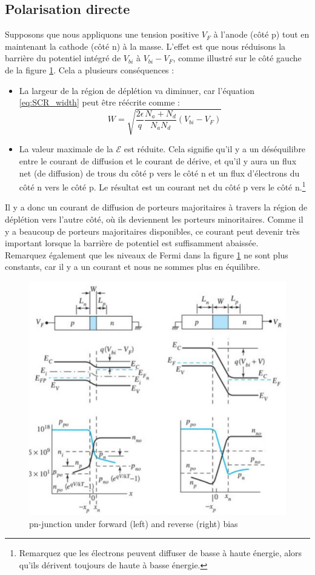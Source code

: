 \subsection{Polarisation directe}
Supposons que nous appliquons une tension positive $V_F$ à l'anode (côté p) tout en maintenant la cathode (côté n) à la masse. L'effet est que nous réduisons la barrière du potentiel intégré de $V_{bi}$ à $V_{bi}-V_F$, comme illustré sur le côté gauche de la figure \ref{fig:pn_bias}. Cela a plusieurs conséquences :
\begin{itemize}
	\item La largeur de la région de déplétion va diminuer, car l'équation \ref{eq:SCR_width} peut être réécrite comme :
	\begin{equation}
		W = \sqrt{\frac{2 \epsilon}{q} \frac{N_a + N_d}{N_a N_d} (V_{bi} - V_F)}
		\label{eq:SCR_width_bias}
	\end{equation}
	\item La valeur maximale de la $\mathcal{E}$  est réduite. Cela signifie qu'il y a un déséquilibre entre le courant de diffusion et le courant de dérive, et qu'il y aura un flux net (de diffusion) de trous du côté p vers le côté n et un flux d'électrons du côté n vers le côté p. Le résultat est un courant net du côté p vers le côté n.\footnote{Remarquez que les électrons peuvent diffuser de basse à haute énergie, alors qu'ils dérivent toujours de haute à basse énergie.}
\end{itemize}
Il y a donc un courant de diffusion de porteurs majoritaires à travers la région de déplétion vers l'autre côté, où ils deviennent les porteurs minoritaires. Comme il y a beaucoup de porteurs majoritaires disponibles, ce courant peut devenir très important lorsque la barrière de potentiel est suffisamment abaissée.\\
Remarquez également que les niveaux de Fermi dans la figure \ref{fig:pn_bias} ne sont plus constants, car il y a un courant et nous ne sommes plus en équilibre.

\begin{figure}[h!]
\centering
\includegraphics[width=12cm]{figures/ch01/pn_bias.jpg}
\caption{pn-junction under forward (left) and reverse (right) bias} 
\label{fig:pn_bias}
\end{figure}

